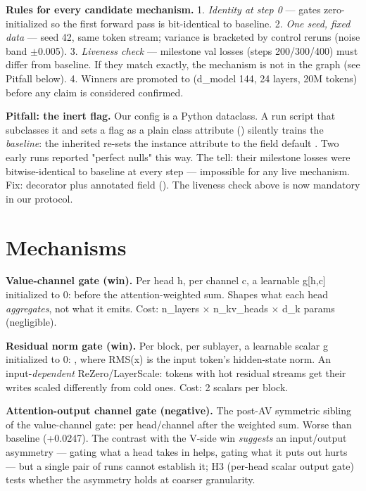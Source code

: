\documentclass[11pt,a4paper]{article}
\begin{document}
\textbf{Rules for every candidate mechanism.} 1. \emph{Identity at step 0} --- gates zero-initialized so the first forward pass is bit-identical to baseline. 2. \emph{One seed, fixed data} --- seed 42, same token stream; variance is bracketed by control reruns (noise band $\pm$0.005). 3. \emph{Liveness check} --- milestone val losses (steps 200/300/400) must differ from baseline. If they match exactly, the mechanism is not in the graph (see Pitfall below). 4. Winners are promoted to \texttt{} (d\_model 144, 24 layers, 20M tokens) before any claim is considered confirmed.

\textbf{Pitfall: the inert flag.} Our config is a Python dataclass. A run script that subclasses it and sets a flag as a plain class attribute (\texttt{}) silently trains the \emph{baseline}: the inherited \texttt{} re-sets the instance attribute to the field default \texttt{}. Two early runs reported "perfect nulls" this way. The tell: their milestone losses were bitwise-identical to baseline at every step --- impossible for any live mechanism. Fix: \texttt{} decorator plus annotated field (\texttt{}). The liveness check above is now mandatory in our protocol.

\section{Mechanisms}

\textbf{Value-channel gate (win).} Per head h, per channel c, a learnable g[h,c] initialized to 0: \texttt{} before the attention-weighted sum. Shapes what each head \emph{aggregates}, not what it emits. Cost: n\_layers $\times$ n\_kv\_heads $\times$ d\_k params (negligible).

\textbf{Residual norm gate (win).} Per block, per sublayer, a learnable scalar g initialized to 0: \texttt{}, where RMS(x) is the input token's hidden-state norm. An input-\emph{dependent} ReZero/LayerScale: tokens with hot residual streams get their writes scaled differently from cold ones. Cost: 2 scalars per block.

\textbf{Attention-output channel gate (negative).} The post-AV symmetric sibling of the value-channel gate: \texttt{} per head/channel after the weighted sum. Worse than baseline (+0.0247). The contrast with the V-side win \emph{suggests} an input/output asymmetry --- gating what a head takes in helps, gating what it puts out hurts --- but a single pair of runs cannot establish it; H3 (per-head scalar output gate) tests whether the asymmetry holds at coarser granularity.
\end{document}
